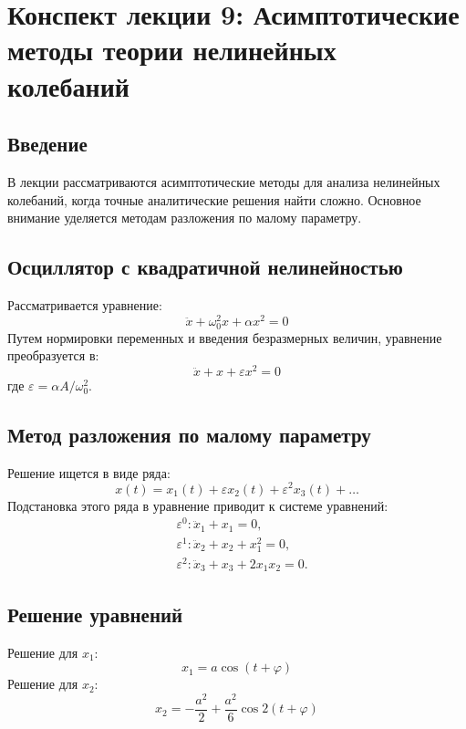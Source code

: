 \documentclass[10pt]{article}
\begin{document}
\section*{Конспект лекции 9: Асимптотические методы теории нелинейных колебаний}

\subsection*{Введение}
В лекции рассматриваются асимптотические методы для анализа нелинейных колебаний, когда точные аналитические решения найти сложно. Основное внимание уделяется методам разложения по малому параметру.

\subsection*{Осциллятор с квадратичной нелинейностью}
Рассматривается уравнение:
\begin{equation*}
\ddot{x}+\omega_{0}^{2} x+\alpha x^{2}=0
\end{equation*}
Путем нормировки переменных и введения безразмерных величин, уравнение преобразуется в:
\begin{equation*}
\ddot{x}+x+\varepsilon x^{2}=0
\end{equation*}
где $\varepsilon=\alpha A / \omega_{0}^{2}$.

\subsection*{Метод разложения по малому параметру}
Решение ищется в виде ряда:
\begin{equation*}
x(t)=x_{1}(t)+\varepsilon x_{2}(t)+\varepsilon^{2} x_{3}(t)+\ldots
\end{equation*}
Подстановка этого ряда в уравнение приводит к системе уравнений:
\begin{align*}
& \varepsilon^{0}: \ddot{x}_{1}+x_{1}=0, \\
& \varepsilon^{1}: \ddot{x}_{2}+x_{2}+x_{1}^{2}=0, \\
& \varepsilon^{2}: \ddot{x}_{3}+x_{3}+2 x_{1} x_{2}=0.
\end{align*}

\subsection*{Решение уравнений}
Решение для $x_{1}$:
\begin{equation*}
x_{1}=a \cos (t+\varphi)
\end{equation*}
Решение для $x_{2}$:
\begin{equation*}
x_{2}=-\frac{a^{2}}{2}+\frac{a^{2}}{6} \cos 2(t+\varphi)
\end{equation*}
\end{document}
